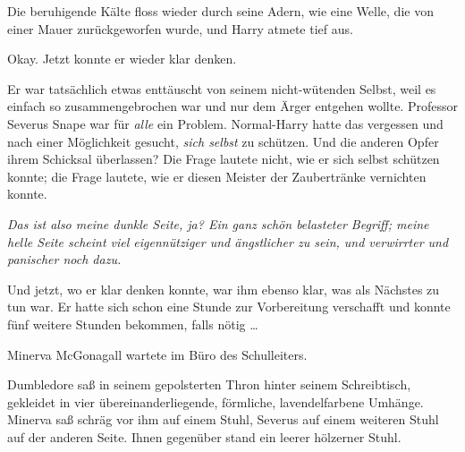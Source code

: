 Die beruhigende Kälte floss wieder durch seine Adern, wie eine Welle, die von einer Mauer zurückgeworfen wurde, und Harry atmete tief aus.

Okay. Jetzt konnte er wieder klar denken.

Er war tatsächlich etwas enttäuscht von seinem nicht-wütenden Selbst, weil es einfach so zusammengebrochen war und nur dem Ärger entgehen wollte. Professor Severus Snape war für \emph{alle} ein Problem. Normal-Harry hatte das vergessen und nach einer Möglichkeit gesucht, \emph{sich selbst} zu schützen. Und die anderen Opfer ihrem Schicksal überlassen? Die Frage lautete nicht, wie er sich selbst schützen konnte; die Frage lautete, wie er diesen Meister der Zaubertränke vernichten konnte.

\emph{Das ist also meine dunkle Seite, ja? Ein ganz schön belasteter Begriff; meine helle Seite scheint viel eigennütziger und ängstlicher zu sein, und verwirrter und panischer noch dazu.}

Und jetzt, wo er klar denken konnte, war ihm ebenso klar, was als Nächstes zu tun war. Er hatte sich schon eine Stunde zur Vorbereitung verschafft und konnte fünf weitere Stunden bekommen, falls nötig …

\later

Minerva McGonagall wartete im Büro des Schulleiters.

Dumbledore saß in seinem gepolsterten Thron hinter seinem Schreibtisch, gekleidet in vier übereinanderliegende, förmliche, lavendelfarbene Umhänge. Minerva saß schräg vor ihm auf einem Stuhl, Severus auf einem weiteren Stuhl auf der anderen Seite. Ihnen gegenüber stand ein leerer hölzerner Stuhl.

